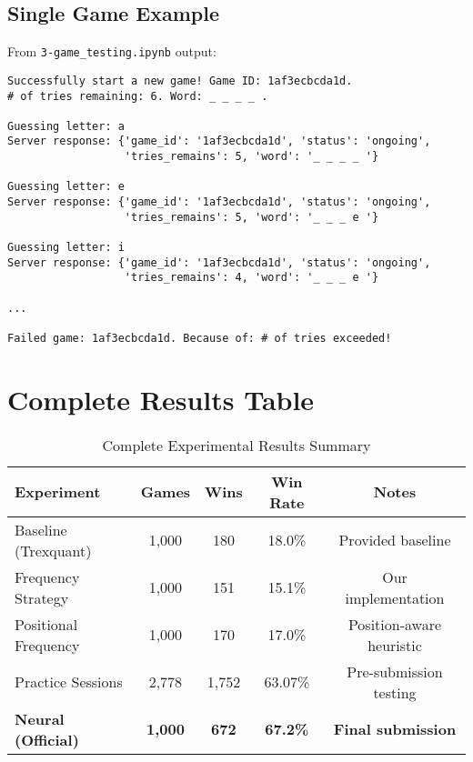 \documentclass[12pt,a4paper]{article}
\begin{document}
\subsection{Single Game Example}

From \texttt{3-game\_testing.ipynb} output:

\begin{verbatim}
Successfully start a new game! Game ID: 1af3ecbcda1d.
# of tries remaining: 6. Word: _ _ _ _ .

Guessing letter: a
Server response: {'game_id': '1af3ecbcda1d', 'status': 'ongoing',
                  'tries_remains': 5, 'word': '_ _ _ _ '}

Guessing letter: e
Server response: {'game_id': '1af3ecbcda1d', 'status': 'ongoing',
                  'tries_remains': 5, 'word': '_ _ _ e '}

Guessing letter: i
Server response: {'game_id': '1af3ecbcda1d', 'status': 'ongoing',
                  'tries_remains': 4, 'word': '_ _ _ e '}

...

Failed game: 1af3ecbcda1d. Because of: # of tries exceeded!
\end{verbatim}

\section{Complete Results Table}

\begin{table}[H]
\centering
\caption{Complete Experimental Results Summary}
\begin{tabular}{@{}lcccc@{}}
\toprule
\textbf{Experiment} & \textbf{Games} & \textbf{Wins} & \textbf{Win Rate} & \textbf{Notes} \\
\midrule
Baseline (Trexquant) & 1,000 & 180 & 18.0\% & Provided baseline \\
Frequency Strategy & 1,000 & 151 & 15.1\% & Our implementation \\
Positional Frequency & 1,000 & 170 & 17.0\% & Position-aware heuristic \\
Practice Sessions & 2,778 & 1,752 & 63.07\% & Pre-submission testing \\
\midrule
\textbf{Neural (Official)} & \textbf{1,000} & \textbf{672} & \textbf{67.2\%} & \textbf{Final submission} \\
\bottomrule
\end{tabular}
\end{table}
\end{document}
